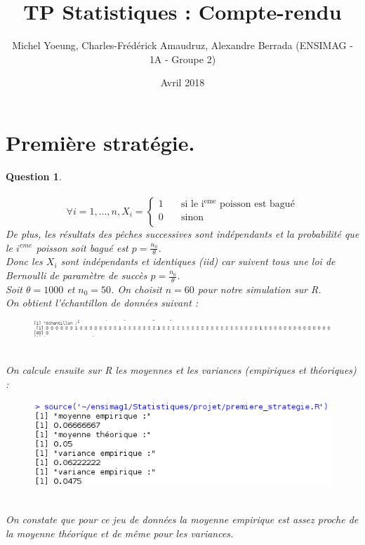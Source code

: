 \documentclass[a4paper,11pt]{article}
\title{TP Statistiques : Compte-rendu}
\author{Michel Yoeung, Charles-Frédérick Amaudruz, Alexandre Berrada (ENSIMAG - 1A - Groupe 2)}
\date{Avril 2018}
\newtheorem{exo1}{Question}
\begin{document}
\maketitle

\section{Première stratégie.}

\begin{exo1} \ \\ \\
\[
  \forall i = 1,...,n, X_{i} = \left\{
                                  \begin{array}{ll}
                                    1 & \quad \mathrm{\text{si le $i^{eme}$ poisson est bagué}} \\
                                    0 & \quad \mathrm{sinon} \\
                                  \end{array}
                                \right.
\]
De plus, les résultats des pêches successives sont indépendants et la probabilité que le $i^{eme}$ poisson soit bagué est $p=\frac{n_{0}}{\theta}$. \ \\
Donc les $X_{i}$ sont indépendants et identiques (iid) car suivent tous une loi de Bernoulli de paramètre de succès $p=\frac{n_{0}}{\theta}$. \ \\
Soit $\theta=1000$ et $n_{0}=50$. On choisit $n=60$ pour notre simulation sur R. \ \\
On obtient l'échantillon de données suivant :
\begin{figure}[h]
\includegraphics[scale=0.45]{images/Q1_1_donnees.png}
\end{figure} \ \\
On calcule ensuite sur R les moyennes et les variances (empiriques et théoriques) :
\begin{figure}[h]
\includegraphics[scale=0.7]{images/Q1_1.png}
\end{figure} \ \\
On constate que pour ce jeu de données la moyenne empirique est assez proche de la moyenne théorique et de même pour les variances.
\end{exo1}
\end{document}
